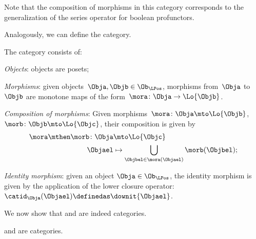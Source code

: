 
\begin{remark}
Note that the composition of morphisms in this category corresponds to the generalization of the series operator for boolean profunctors.
\end{remark}

Analogously, we can define the \LPos category.
\begin{definition}
\label{def:lpos_cat}
The category \LPos consists of:
\begin{compactenum}
    \item \emph{Objects}: objects are posets;
    \item \emph{Morphisms}: given objects~$\Obja,\Objb\in \Ob_\LPos$, morphisms from~$\Obja$ to~$\Objb$ are monotone maps of the form~$\mora \colon \Obja \to \Lo{\Objb}$.
    \item \emph{Composition of morphisms}: Given morphisms~$\mora \colon \Obja \mto \Lo{\Objb}$,~$\morb \colon \Objb\mto \Lo{\Objc}$, their composition is given by
    \begin{equation}
    \begin{aligned}
        \mora \mthen \morb \colon \Obja &\mto \Lo{\Objc}\\
        \Objael&\mapsto \bigcup_{\Objbel\in \mora (\Objael)}\morb(\Objbel);
    \end{aligned}
    \end{equation}
    \item \emph{Identity morphism}: given an object $\Obja\in \Ob_\LPos$, the identity morphism is given by the application of the lower closure operator:~$\catid_\Obja(\Objael)\definedas \downit\{\Objael\}$.
\end{compactenum}
\end{definition}

We now show that \UPos and \LPos are indeed categories.

\begin{lemma}
\label{lem:upos_lpos_cats}
\UPos and \LPos are categories.
\end{lemma}

